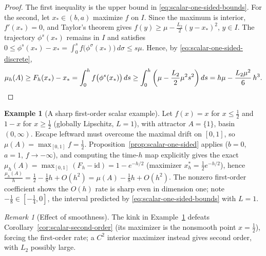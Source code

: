 \documentclass[pdflatex,sn-mathphys-num]{sn-jnl}
\numberwithin{equation}{section}
\theoremstyle{thmstyleone}%
\theoremstyle{definition}
\newtheorem{example}[theorem]{Example}
\theoremstyle{remark}
\newtheorem{remark}[theorem]{Remark}
\begin{document}
\begin{proof}
The first inequality is the upper bound in
\eqref{eq:scalar-one-sided-bounds}. For the second, let
$x_*\in(b,a)$ maximize $f$ on $I$. Since the maximum is interior,
$f'(x_*)=0$, and Taylor's theorem gives
    $f(y)\geq\mu-\frac{L_2}{2}(y-x_*)^2$,
     $y\in I$.
The trajectory $\phi^s(x_*)$ remains in $I$ and satisfies
    $0
    \leq
    \phi^s(x_*)-x_*
    =
    \int_0^s f\bigl(\phi^\sigma(x_*)\bigr)\,d\sigma
    \leq
    s\mu$.
Hence, by \eqref{eq:scalar-one-sided-discrete},
\[
    \mu_h(A)
    \geq
    F_h(x_*)-x_*
    =
    \int_0^h f\bigl(\phi^s(x_*)\bigr)\,ds
    \geq
    \int_0^h
    \left(
        \mu-\frac{L_2}{2}\mu^2s^2
    \right)ds
    =
    h\mu-\frac{L_2\mu^2}{6}\,h^3.
    \qedhere
\]
\end{proof}

\begin{example}[A sharp first-order scalar example]
\label{ex:sharp-scalar}
Let $f(x)=x$ for $x\le\tfrac12$ and $1-x$ for $x\ge\tfrac12$ (globally
Lipschitz, $L=1$), with attractor $A=\{1\}$, basin $(0,\infty)$. Escape
leftward must overcome the maximal drift on $[0,1]$, so $\mu(A)=\max_{[0,1]}
f=\tfrac12$. Proposition~\ref{prop:scalar-one-sided} applies ($b=0$, $a=1$,
$f\to-\infty$), and computing the time-$h$ map explicitly gives the exact
$\mu_h(A)=\max_{[0,1]}(F_h-\mathrm{id})=1-e^{-h/2}$ (maximizer
$x_h^\ast=\tfrac12 e^{-h/2}$), hence
    $\frac{\mu_h(A)}{h}=\tfrac12-\tfrac18 h+O(h^2)=\mu(A)-\tfrac18 h+O(h^2)$.
The nonzero first-order coefficient shows the $O(h)$ rate is sharp even in
dimension one; note $-\tfrac18\in[-\tfrac14,0]$, the interval predicted by
\eqref{eq:scalar-one-sided-bounds} with $L=1$.
\end{example}

\begin{remark}[Effect of smoothness]
\label{rem:smooth-superconvergence}
The kink in Example~\ref{ex:sharp-scalar} defeats Corollary~\ref{cor:scalar-second-order} (its maximizer is the nonsmooth point $x=\tfrac12$), forcing the first-order rate; a $C^2$ interior maximizer instead gives second order, with $L_2$ possibly large.
\end{remark}
\end{document}

